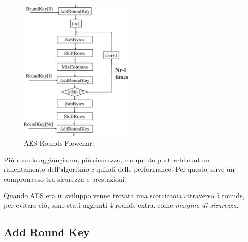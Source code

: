 \begin{figure}[H] %
	\centering
	\includegraphics[width=0.5\textwidth, height=0.5\textheight, keepaspectratio]{./images/aes/flowcharts/aes_flowchart.png}
	\caption{AES Rounds Flowchart}
	\label{fig:aes_flowchart2}
\end{figure}

\textsf{\small Più rounds aggiungiamo, più sicurezza, ma questo porterebbe ad un rallentamento dell'algoritmo e quindi delle performance.}
\textsf{\small Per questo serve un compromesso tra sicurezza e prestazioni.}

\textsf{\small Quando AES era in sviluppo venne trovata una scorciatoia attraverso 6 rounds, per evitare ciò, sono stati aggiunti 4 rounds extra, come \emph{margine di sicurezza}.} %




\subsection{Add Round Key}

\textsf{\small }

